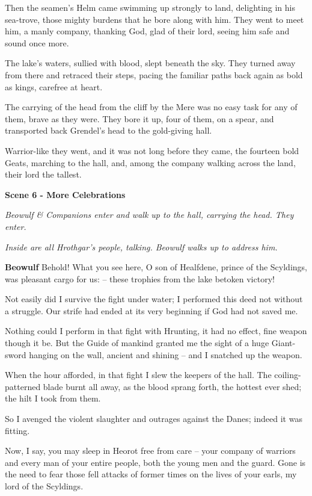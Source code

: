 \documentclass[a4paper]{article}
\begin{document}
{Then the seamen’s Helm came swimming up
strongly to land, delighting in his sea-trove,
those mighty burdens that he bore along with him.
They went to meet him, a manly company,
thanking God, glad of their lord,
seeing him safe and sound once more.

The lake’s waters,
sullied with blood, slept beneath the sky.
They turned away from there and retraced their steps,
pacing the familiar paths back again
as bold as kings, carefree at heart.

The carrying of the head from the cliff by the Mere
was no easy task for any of them,
brave as they were. They bore it up,
four of them, on a spear, and transported back
Grendel’s head to the gold-giving hall.

Warrior-like they went, and it was not long
before they came, the fourteen bold Geats,
marching to the hall, and, among the company
walking across the land, their lord the tallest.

\centerline{\textbf{Scene 6 - More Celebrations}}

\centerline{\textit{Beowulf \& Companions enter and walk up to the hall, carrying the head. They enter.}}
\centerline{\textit{Inside are all Hrothgar's people, talking. Beowulf walks up to address him.}}

\textbf{Beowulf} Behold! What you see here, O son of Healfdene,
prince of the Scyldings, was pleasant cargo for us:
– these trophies from the lake betoken victory!

Not easily did I survive
the fight under water; I performed this deed
not without a struggle. Our strife had ended
at its very beginning if God had not saved me.

Nothing could I perform in that fight with Hrunting,
it had no effect, fine weapon though it be.
But the Guide of mankind granted me the sight
of a huge Giant-sword hanging on the wall,
ancient and shining – and I snatched up the weapon.

When the hour afforded, in that fight I slew
the keepers of the hall. The coiling-patterned
blade burnt all away, as the blood sprang forth,
the hottest ever shed; the hilt I took from them.

So I avenged the violent slaughter
and outrages against the Danes; indeed it was fitting.

Now, I say, you may sleep in Heorot
free from care – your company of warriors
and every man of your entire people,
both the young men and the guard. Gone is the need
to fear those fell attacks of former times
on the lives of your earls, my lord of the Scyldings.

}
\end{document}
